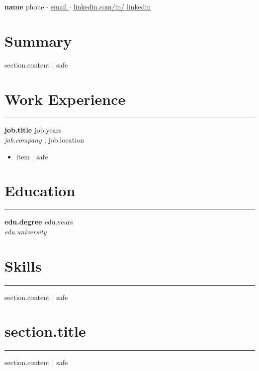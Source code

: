 \documentclass[10pt,a4paper]{article}
\begin{document}
\begin{center}
    {\Huge \textbf{ {{ name }} }}
    \vspace{5pt}
    {{ phone }} $\cdot$ \href{mailto:{{ email }}}{ {{ email }} } $\cdot$ \href{https://linkedin.com/in/{{ linkedin }}}{linkedin.com/in/{{ linkedin }}}
\end{center}

        \section*{Summary}
        {{ section.content | safe }}
        \section*{Work Experience}
        \hrule\vspace{8pt}
            \textbf{ {{ job.title }} } \hfill {{ job.years }} \\
            \textit{ {{ job.company }} }, {{ job.location }}
            \begin{itemize}\setlength\itemsep{-0.5em}
                \item {{ item | safe }}
            \end{itemize}\vspace{5pt}
        \section*{Education}
        \hrule\vspace{8pt}
            \textbf{ {{ edu.degree }} } \hfill {{ edu.years }} \\
            \textit{ {{ edu.university }} }\vspace{5pt}
        \section*{Skills}
        \hrule\vspace{8pt}
        {{ section.content | safe }}
        \section*{ {{ section.title }} }
        \hrule\vspace{8pt}
        {{ section.content | safe }}

\vfill
{}
\end{document}
